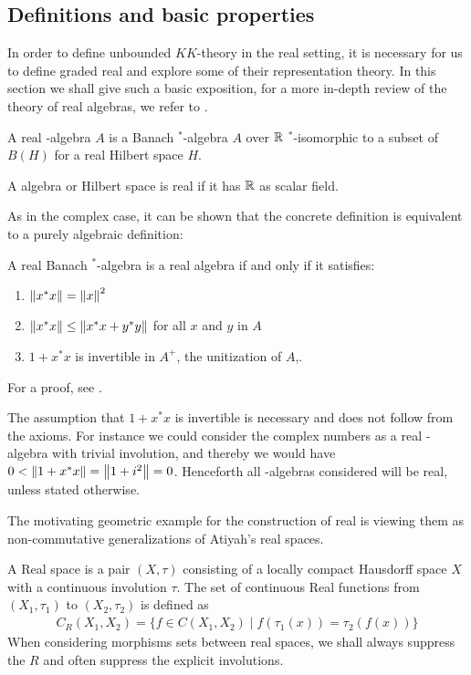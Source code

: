 \subsection{Definitions and basic properties}
In order to define unbounded $KK$-theory in the real setting, it is necessary for us to define graded real \Cstar and explore some of their representation theory. In this section we shall give such a basic exposition, for a more in-depth review of the theory of real \Cstar algebras, we refer to \cite{goodearl}. 
\begin{definition}
A real \Cstar-algebra $A$ is a Banach $^*$-algebra $A$ over $\mathbb{R}$ $^*$-isomorphic to a subset of $B(H)$ for a real Hilbert space $H$. 
\end{definition}
\begin{remark}
	A \Cstar algebra or Hilbert space is real if it has $\mathbb{R}$ as scalar field. 
\end{remark}
\noindent As in the complex case, it can be shown that the concrete definition is equivalent to a purely algebraic definition:
\begin{theorem}
A real Banach $^*$-algebra is a real \Cstar algebra if and only if it satisfies: 
\begin{enumerate}
\item
	$\left \Vert x^*x \right \Vert=\left \Vert x \right \Vert^2$
\item
	$\left \Vert x^*x \right \Vert\leq \left \Vert x^*x+y^*y \right \Vert$ for all $x$ and $y$ in $A$
\item
	$1+x^*x$ is invertible in $A^+$, the unitization of $A$,. 
\end{enumerate}
\end{theorem}
For a proof, see \cite{goodearl}.
\begin{remark}
	The assumption that $1+x^*x$ is invertible is necessary and does not follow from the axioms. For instance we could consider the complex numbers as a real \Cstar-algebra with trivial involution, and thereby we would have $0<\left \Vert 1+x^*x \right \Vert=\left \Vert 1+i^2 \right \Vert=0$. Henceforth all \Cstar-algebras considered will be real, unless stated otherwise. 
\end{remark}
The motivating geometric example for the construction of real \Cstar is viewing them as non-commutative generalizations of Atiyah's real spaces. 
\begin{definition}
	A Real space is a pair $(X,\tau)$ consisting of a locally compact Hausdorff space $X$ with a continuous involution $\tau$. The set of continuous Real functions from $(X_1,\tau_1)$ to $(X_2,\tau_2)$ is defined as 
	\begin{align*}
		C_R(X_1,X_2)=\{f\in C(X_1,X_2) \mid f(\tau_1(x))=\tau_2(f(x))\}
	\end{align*}
	When considering morphisms sets between real spaces, we shall always suppress the $R$ and often suppress the explicit involutions.  
\end{definition}
